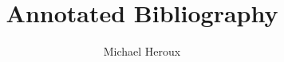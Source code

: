 \documentclass{article}
\title{Annotated Bibliography}
\author{Michael Heroux}
\begin{document}
\maketitle

\nocite{*}



\end{document}
